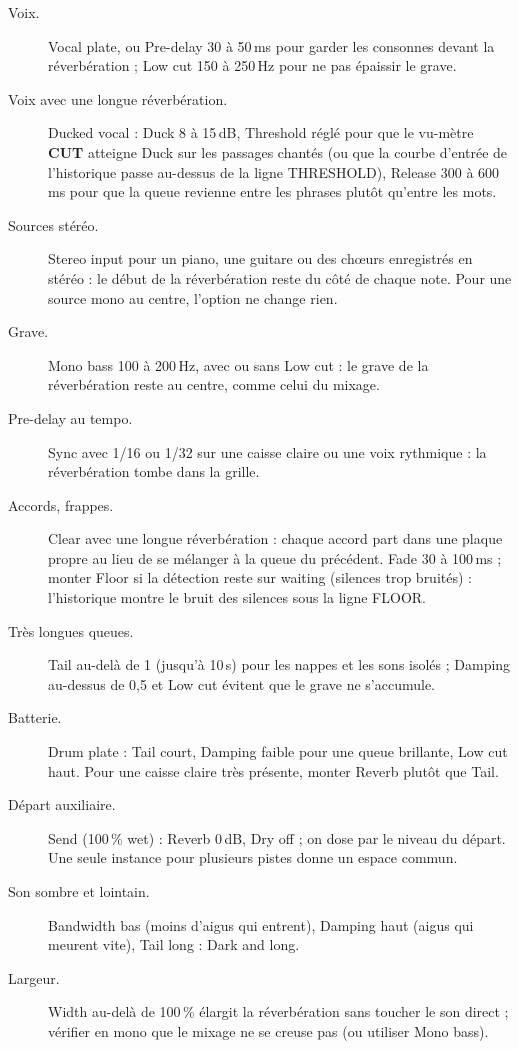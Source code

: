 \documentclass[a4paper,11pt]{article}
\newcommand{\ctl}[1]{\textsf{\textbf{#1}}}   %
\newcommand{\dB}{\,dB}
\begin{document}
\begin{description}
\item[Voix.] Vocal plate, ou Pre-delay 30 à 50\,ms pour garder les consonnes devant la
  réverbération ; Low cut 150 à 250\,Hz pour ne pas épaissir le grave.
\item[Voix avec une longue réverbération.] Ducked vocal : Duck 8 à 15\dB, Threshold réglé pour
  que le vu-mètre \ctl{CUT} atteigne Duck sur les passages chantés (ou que la courbe d'entrée de
  l'historique passe au-dessus de la ligne THRESHOLD), Release 300 à 600\,ms pour
  que la queue revienne entre les phrases plutôt qu'entre les mots.
\item[Sources stéréo.] Stereo input pour un piano, une guitare ou des chœurs enregistrés en
  stéréo : le début de la réverbération reste du côté de chaque note. Pour une source mono au
  centre, l'option ne change rien.
\item[Grave.] Mono bass 100 à 200\,Hz, avec ou sans Low cut : le grave de la réverbération reste
  au centre, comme celui du mixage.
\item[Pre-delay au tempo.] Sync avec 1/16 ou 1/32 sur une caisse claire ou une voix rythmique :
  la réverbération tombe dans la grille.
\item[Accords, frappes.] Clear avec une longue réverbération : chaque accord part dans une
  plaque propre au lieu de se mélanger à la queue du précédent. Fade 30 à 100\,ms ; monter Floor
  si la détection reste sur \og waiting\fg{} (silences trop bruités) : l'historique montre le
  bruit des silences sous la ligne FLOOR.
\item[Très longues queues.] Tail au-delà de 1 (jusqu'à 10\,s) pour les nappes et les sons
  isolés ; Damping au-dessus de 0,5 et Low cut évitent que le grave ne s'accumule.
\item[Batterie.] Drum plate : Tail court, Damping faible pour une queue brillante, Low cut haut.
  Pour une caisse claire très présente, monter Reverb plutôt que Tail.
\item[Départ auxiliaire.] Send (100\,\% wet) : Reverb 0\dB, Dry off ; on dose par le niveau du départ. Une
  seule instance pour plusieurs pistes donne un espace commun.
\item[Son sombre et lointain.] Bandwidth bas (moins d'aigus qui entrent), Damping haut (aigus qui
  meurent vite), Tail long : Dark and long.
\item[Largeur.] Width au-delà de 100\,\% élargit la réverbération sans toucher le son direct ;
  vérifier en mono que le mixage ne se creuse pas (ou utiliser Mono bass).

\end{description}
\end{document}
